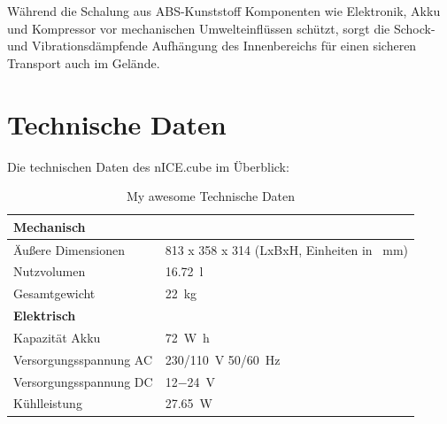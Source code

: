 	Während die Schalung aus ABS-Kunststoff Komponenten wie Elektronik, Akku und Kompressor vor mechanischen Umwelteinflüssen schützt, sorgt die Schock- und Vibrationsdämpfende Aufhängung
	des Innenbereichs für einen sicheren Transport auch im Gelände.
	\clearpage
	\section{Technische Daten}
		Die technischen Daten des \frq nICE.cube\flq{} im Überblick:\
		\begin{table}[h]
			\centering
			\caption{My awesome Technische Daten}
			\begin{tabular}{@{}p{}p{}@{}}
				\toprule
				\textbf{Mechanisch} & \\
				\midrule
				Äußere Dimensionen & 813 x 358 x 314 (LxBxH, Einheiten in \SI{}{\milli\metre})\\
				Nutzvolumen & \SI{16,72}{\litre}\\
				Gesamtgewicht & \SI{22}{\kilo\gram}\\
				\midrule
				\textbf{Elektrisch} & \\
				\midrule
				Kapazität Akku & \SI{72}{\watt\hour}\\
				Versorgungsspannung AC & \SI{230/110}{\volt} \SI{50/60}{\hertz}\\
				Versorgungsspannung DC & \SI{12-24}{\volt}\\
				Kühlleistung & \SI{27,65}{\watt} \cite{Kompressor.datenblatt.Masterflux.20210727}\\

				\bottomrule
			\end{tabular}
			\label{tab:tech daten}
		\end{table}